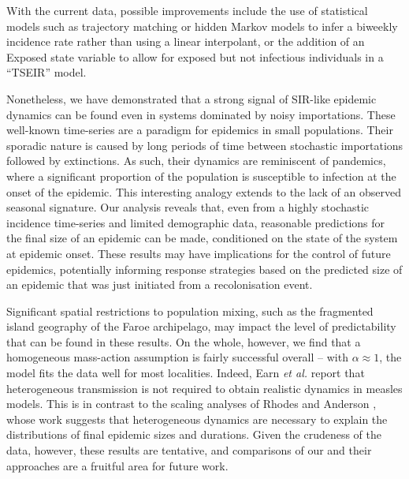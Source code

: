 \documentclass[10pt]{article}
\begin{document}
With the current data, possible improvements include the use of statistical models such as trajectory matching or hidden Markov models to infer a biweekly incidence rate rather than using a linear interpolant, or the addition of an Exposed state variable to allow for exposed but not infectious individuals in a ``TSEIR'' model. 

Nonetheless, we have demonstrated that a strong signal of SIR-like epidemic dynamics can be found even in systems dominated by noisy importations. These well-known time-series \cite{Cliff1981, Cliff2000} are a paradigm for epidemics in small populations. Their sporadic nature is caused by long periods of time between stochastic importations followed by extinctions. As such, their dynamics are reminiscent of pandemics, where a significant proportion of the population is susceptible to infection at the onset of the epidemic. This interesting analogy extends to the lack of an observed seasonal signature. Our analysis reveals that, even from a highly stochastic incidence time-series and limited demographic data, reasonable predictions for the final size of an epidemic can be made, conditioned on the state of the system at epidemic onset. These results may have implications for the control of future epidemics, potentially informing response strategies based on the predicted size of an epidemic that was just initiated from a recolonisation event.

Significant spatial restrictions to population mixing, such as the fragmented island geography of the Faroe archipelago, may impact the level of predictability that can be found in these results. On the whole, however, we find that a homogeneous mass-action assumption is fairly successful overall -- with $\alpha \approx 1$, the model fits the data well for most localities. Indeed, Earn \textit{et al.} \cite{Earn2000} report that heterogeneous transmission is not required to obtain realistic dynamics in measles models. This is in contrast to the scaling analyses of Rhodes and Anderson \cite{Rhodes1996a, Rhodes1996b}, whose work suggests that heterogeneous dynamics are necessary to explain the distributions of final epidemic sizes and durations. Given the crudeness of the data, however, these results are tentative, and comparisons of our and their approaches are a fruitful area for future work.
\end{document}
